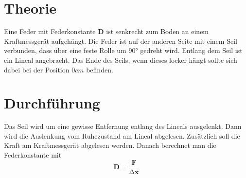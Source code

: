 










    \section{Theorie}
    	Eine Feder mit Federkonstante $\symbf{D}$ ist senkrecht zum Boden an einem Kraftmessgerät aufgehängt.
        Die Feder ist auf der anderen Seite mit einem Seil verbunden, dass über eine feste Rolle um 90° gedreht wird.
        Entlang dem Seil ist ein Lineal angebracht. Das Ende des Seils, wenn dieses locker hängt sollte sich dabei bei der Position 0$\unit{cm}$ befinden.

    \section{Durchführung}
        Das Seil wird um eine gewisse Entfernung entlang des Lineals ausgelenkt.
        Dann wird die Auslenkung vom Ruhezustand am Lineal abgelesen.
        Zusätzlich soll die Kraft am Kraftmessgerät abgelesen werden.
        Danach berechnet man die Federkonstante mit 
        \begin{equation}
            \symbf{D}=\frac{\symbf{F}}{\increment\symbf{x}}
        \end{equation}
